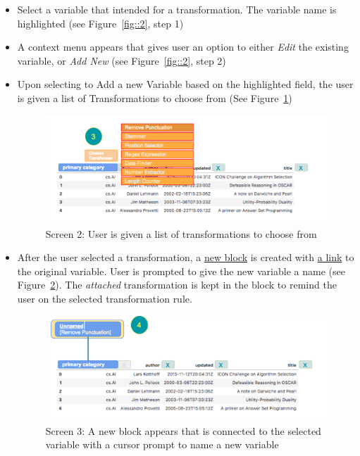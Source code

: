 \documentclass[12pt,letterpaper]{article}
\begin{document}
\begin{itemize}
    \item Select a variable that intended for a transformation. The variable name is highlighted (see Figure~\ref{fig::2}, step 1)
    \item A context menu appears that gives user an option to either \textit{Edit} the existing variable, or \textit{Add New}  (see Figure~\ref{fig::2}, step 2)
    \item Upon selecting to Add a new Variable based on the highlighted field, the user is given a list of Transformations to choose from (See Figure~\ref{fig::3})
    
\begin{figure}[h]
\centering
\includegraphics[scale=.3]{figures/m3/wireframe-screen2.png}
\caption{Screen 2: User is given a list of transformations to choose from}
\label{fig::3}
\end{figure}

    \item After the user selected a transformation, a \underline{new block} is created with \underline{a link} to the original variable. User is prompted to give the new variable a name (see Figure~\ref{fig::4}). The \textit{attached} transformation is kept in the block to remind the user on the selected transformation rule. 
    
    
\begin{figure}[h]
\centering
\includegraphics[scale=.3]{figures/m3/wireframe-screen3.png}
\caption{Screen 3: A new block appears that is connected to the selected variable with a cursor prompt to name a new variable}
\label{fig::4}
\end{figure}


\end{itemize}
\end{document}
